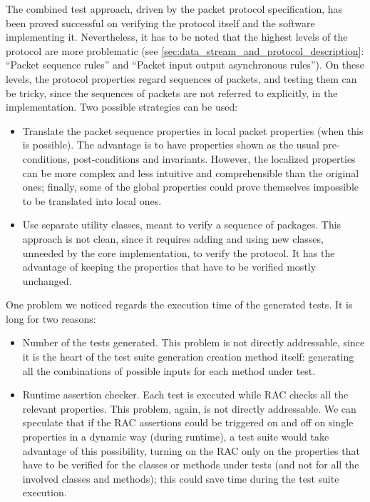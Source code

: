 \documentclass{article} \usepackage{times}
\begin{document}
The combined test approach, driven by the packet protocol
specification, has been proved successful on verifying the protocol
itself and the software implementing it.  Nevertheless, it has to be
noted that the highest levels of the protocol are more problematic
(see \ref{sec:data_stream_and_protocol_description}: ``Packet sequence
rules'' and ``Packet input output asynchronous rules'').  On these
levels, the protocol properties regard sequences of packets, and
testing them can be tricky, since the sequences of packets are not
referred to explicitly, in the implementation.  Two possible
strategies can be used:
 
\begin{itemize}
\item Translate the packet sequence properties in local packet
  properties (when this is possible).  The advantage is to have
  properties shown as the usual pre-conditions, post-conditions and
  invariants.  However, the localized properties can be more complex
  and less intuitive and comprehensible than the original ones;
  finally, some of the global properties could prove themselves
  impossible to be translated into local ones.
\item Use separate utility classes, meant to verify a sequence of
  packages.  This approach is not clean, since it requires adding and
  using new classes, unneeded by the core implementation, to verify
  the protocol.  It has the advantage of keeping the properties that
  have to be verified mostly unchanged.
\end{itemize}

One problem we noticed regards the execution time of the generated
tests.  It is long for two reasons:

\begin{itemize}
\item Number of the tests generated. This problem is not directly
  addressable, since it is the heart of the test suite generation
  creation method itself: generating all the combinations of possible
  inputs for each method under test.
\item Runtime assertion checker. Each test is executed while RAC
  checks all the relevant properties. This problem, again, is not
  directly addressable. We can speculate that if the RAC assertions
  could be triggered on and off on single properties in a dynamic way
  (during runtime), a test suite would take advantage of this
  possibility, turning on the RAC only on the properties that have to
  be verified for the classes or methods under tests (and not for all
  the involved classes and methods); this could save time during the
  test suite execution.
\end{itemize}
\end{document}
